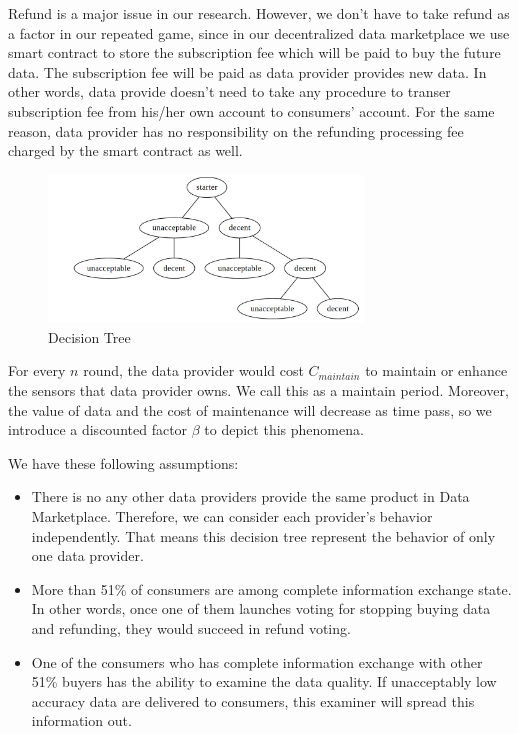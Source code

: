 \documentclass[journal,a4paper]{IEEEtran}
\begin{document}
Refund is a major issue in our research. However, we don't have to take refund as a factor in our repeated game, since in our decentralized data marketplace we use smart contract to store the subscription fee which will be paid to buy the future data. The subscription fee will be paid as data provider provides new data. In other words, data provide doesn't need to take any procedure to transer subscription fee from his/her own account to consumers' account. For the same reason, data provider has no responsibility on the refunding processing fee charged by the smart contract as well.

\begin{figure} \centering \includegraphics[width=3.3in]{img/decision_tree.png} \caption{Decision Tree}
    \label{fig:decision_tree} \end{figure}
For every $n$ round, the data provider would cost $C_{maintain}$ to maintain or enhance the sensors that data provider owns. We call this as a maintain period. Moreover, the value of data and the cost of maintenance will decrease as time pass, so we introduce a discounted factor $\beta$ to depict this phenomena.

We have these following assumptions:
\begin{itemize}
\item  There is no any other data providers provide the same product in Data Marketplace. Therefore, we can consider each provider's behavior independently. That means this decision tree represent the behavior of only one data provider.
\item  More than 51\% of consumers are among complete information exchange state. In other words, once one of them launches voting for stopping buying data and refunding, they would succeed in refund voting.
\item  One of the consumers who has complete information exchange with other 51\% buyers has the ability to examine the data quality. If unacceptably low accuracy data are delivered to consumers, this examiner will spread this information out.
\end{itemize}
\end{document}
